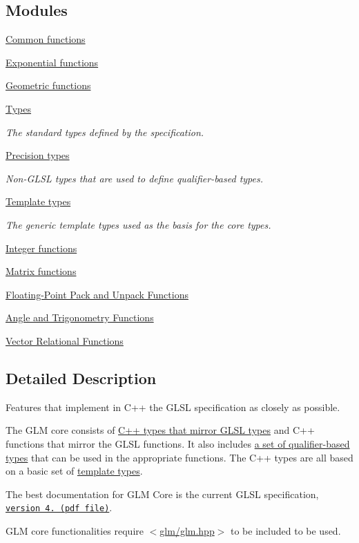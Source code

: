 \subsection*{Modules}
\begin{DoxyCompactItemize}
\item 
\hyperlink{group__core__func__common}{Common functions}
\item 
\hyperlink{group__core__func__exponential}{Exponential functions}
\item 
\hyperlink{group__core__func__geometric}{Geometric functions}
\item 
\hyperlink{group__core__types}{Types}
\begin{DoxyCompactList}\small\item\em The standard types defined by the specification. \end{DoxyCompactList}\item 
\hyperlink{group__core__precision}{Precision types}
\begin{DoxyCompactList}\small\item\em Non-\/\+G\+L\+SL types that are used to define qualifier-\/based types. \end{DoxyCompactList}\item 
\hyperlink{group__core__template}{Template types}
\begin{DoxyCompactList}\small\item\em The generic template types used as the basis for the core types. \end{DoxyCompactList}\item 
\hyperlink{group__core__func__integer}{Integer functions}
\item 
\hyperlink{group__core__func__matrix}{Matrix functions}
\item 
\hyperlink{group__core__func__packing}{Floating-\/\+Point Pack and Unpack Functions}
\item 
\hyperlink{group__core__func__trigonometric}{Angle and Trigonometry Functions}
\item 
\hyperlink{group__core__func__vector__relational}{Vector Relational Functions}
\end{DoxyCompactItemize}


\subsection{Detailed Description}
Features that implement in C++ the G\+L\+SL specification as closely as possible. 

The G\+LM core consists of \hyperlink{group__core__types}{C++ types that mirror G\+L\+SL types} and C++ functions that mirror the G\+L\+SL functions. It also includes \hyperlink{group__core__precision}{a set of qualifier-\/based types} that can be used in the appropriate functions. The C++ types are all based on a basic set of \hyperlink{group__core__template}{template types}.

The best documentation for G\+LM Core is the current G\+L\+SL specification, \href{http://www.opengl.org/registry/doc/GLSLangSpec.4.20.8.clean.pdf}{\tt version 4. (pdf file)}.

G\+LM core functionalities require $<$\hyperlink{glm_8hpp}{glm/glm.\+hpp}$>$ to be included to be used. 